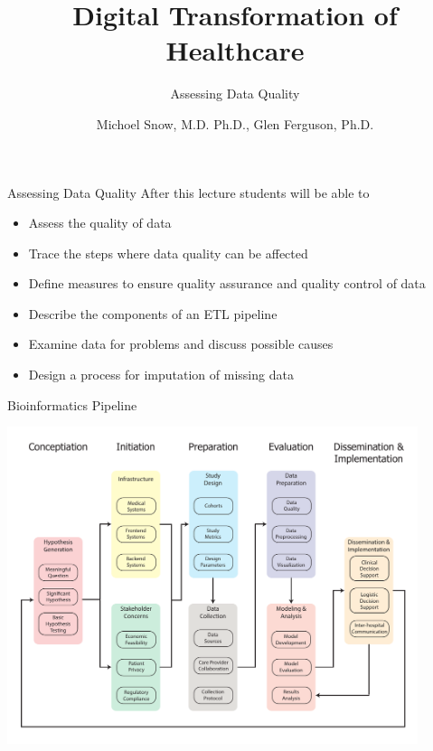 \documentclass[10pt, xcolor=table]{beamer}
\title{Digital Transformation of Healthcare}
\subtitle{Assessing Data Quality}
\date{}
\author{Michoel Snow, M.D. Ph.D., Glen Ferguson, Ph.D.}
\institute{Center for Health Data Innovations}
\begin{document}
\maketitle


\begin{frame}{Assessing Data Quality}
	After this lecture students will be able to 
	\begin{itemize}
		\item Assess the quality of data
		\item Trace the steps where data quality can be affected 
		\item Define measures to ensure quality assurance and quality control of data 
		\item Describe the components of an ETL pipeline
		\item Examine data for problems and discuss possible causes
		\item Design a process for imputation of missing data 
	\end{itemize}
\end{frame}


\begin{frame}{Bioinformatics Pipeline}
	\begin{center}
		\includegraphics[width=0.9\textwidth]{images/informatics_pipeline.pdf}	
	\end{center}
\end{frame}
\end{document}
